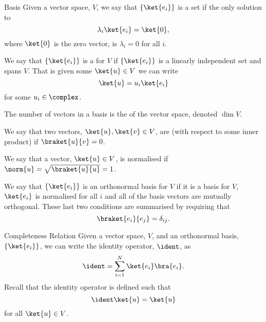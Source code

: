 \begin{dfn}{Basis}{}
    Given a vector space, \(V\), we say that \(\{\ket{e_i}\}\) is a  set if the only solution to
    \begin{equation}
        \lambda_i\ket{e_i} = \ket{0},
    \end{equation}
    where \(\ket{0}\) is the zero vector, is \(\lambda_i = 0\) for all \(i\).
    
    We say that \(\{\ket{e_i}\}\) is a  for \(V\) if \(\{\ket{e_i}\}\) is a linearly independent set and spans \(V\).
    That is given some \(\ket{u} \in V\) we can write
    \begin{equation}
        \ket{u} = u_i\ket{e_i}
    \end{equation}
    for some \(u_i \in \complex\).
    
    The number of vectors in a basis is the  of the vector space, denoted \(\dim V\).
    
    We say that two vectors, \(\ket{u}, \ket{v} \in V\), are  (with respect to some inner product) if \(\braket{u}{v} = 0\).
    
    We say that a vector, \(\ket{u} \in V\), is normalised if \(\norm{u} = \sqrt{\braket{u}{u}} = 1\).
    
    We say that \(\{\ket{e_i}\}\) is an orthonormal basis for \(V\) if it is a basis for \(V\), \(\ket{e_i}\) is normalised for all \(i\) and all of the basis vectors are mutually orthogonal.
    These last two conditions are summarised by requiring that
    \begin{equation}
        \braket{e_i}{e_j} = \delta_{ij}.
    \end{equation}
\end{dfn}

\begin{dfn}{Completeness Relation}{}
    Given a vector space, \(V\), and an orthonormal basis, \(\{\ket{e_i}\}\), we can write the identity operator, \(\ident\), as
    \begin{equation}
        \ident = \sum_{i=1}^{N} \ket{e_i}\bra{e_i}.
    \end{equation}
    Recall that the identity operator is defined such that
    \begin{equation}
        \ident\ket{u} = \ket{u}
    \end{equation}
    for all \(\ket{u} \in V\).
\end{dfn}

